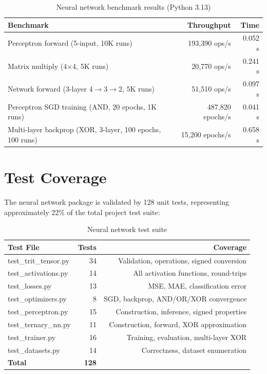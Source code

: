 \documentclass[12pt,a4paper,twoside]{book}
\theoremstyle{trinarytheorem}
\theoremstyle{trinarydefinition}
\newcommand{\code}[1]{\textsf{#1}}
\begin{document}
\begin{table}[H]
\centering
\caption{Neural network benchmark results (Python 3.13)}
\label{tab:nnbench}
\begin{tabular}{lrr}
\toprule
Benchmark & Throughput & Time \\
\midrule
Perceptron forward (5-input, 10K runs) & 193,390 ops/s & 0.052 s \\
Matrix multiply (4$\times$4, 5K runs) & 20,770 ops/s & 0.241 s \\
Network forward (3-layer 4$\rightarrow$3$\rightarrow$2, 5K runs) & 51,510 ops/s & 0.097 s \\
Perceptron SGD training (AND, 20 epochs, 1K runs) & 487,820 epochs/s & 0.041 s \\
Multi-layer backprop (XOR, 3-layer, 100 epochs, 100 runs) & 15,200 epochs/s & 0.658 s \\
\bottomrule
\end{tabular}
\end{table}

\section{Test Coverage}

The neural network package is validated by 128 unit tests, representing
approximately 22\% of the total project test suite:

\begin{table}[H]
\centering
\caption{Neural network test suite}
\label{tab:nntests}
\begin{tabular}{lrr}
\toprule
Test File & Tests & Coverage \\
\midrule
\code{test\_trit\_tensor.py} & 34 & Validation, operations, signed conversion \\
\code{test\_activations.py} & 14 & All activation functions, round-trips \\
\code{test\_losses.py} & 13 & MSE, MAE, classification error \\
\code{test\_optimizers.py} & 8 & SGD, backprop, AND/OR/XOR convergence \\
\code{test\_perceptron.py} & 15 & Construction, inference, signed properties \\
\code{test\_ternary\_nn.py} & 11 & Construction, forward, XOR approximation \\
\code{test\_trainer.py} & 16 & Training, evaluation, multi-layer XOR \\
\code{test\_datasets.py} & 14 & Correctness, dataset enumeration \\
\midrule
\textbf{Total} & \textbf{128} & \\
\bottomrule
\end{tabular}
\end{table}
\end{document}
